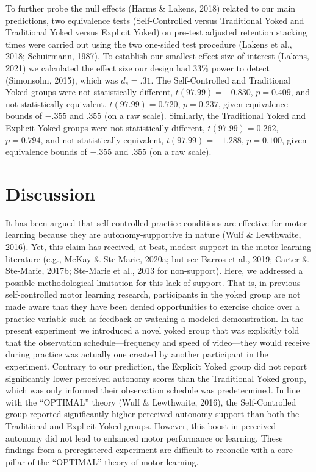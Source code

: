\documentclass[
  english,
  man,floatsintext]{apa7}
\begin{document}
To further probe the null effects (Harms \& Lakens, 2018) related to our main predictions, two equivalence tests (Self-Controlled versus Traditional Yoked and Traditional Yoked versus Explicit Yoked) on pre-test adjusted retention stacking times were carried out using the two one-sided test procedure (Lakens et al., 2018; Schuirmann, 1987). To establish our smallest effect size of interest (Lakens, 2021) we calculated the effect size our design had 33\% power to detect (Simonsohn, 2015), which was \(d_{s} = .31\). The Self-Controlled and Traditional Yoked groups were not statistically different, \(t(97.99) = -0.830\), \(p = 0.409\), and not statistically equivalent, \(t(97.99) = 0.720\), \(p = 0.237\), given equivalence bounds of \(-.355\) and \(.355\) (on a raw scale). Similarly, the Traditional Yoked and Explicit Yoked groups were not statistically different, \(t(97.99) = 0.262\), \(p = 0.794\), and not statistically equivalent, \(t(97.99) = -1.288\), \(p = 0.100\), given equivalence bounds of \(-.355\) and \(.355\) (on a raw scale).

\hypertarget{discussion}{%
\section{Discussion}\label{discussion}}

It has been argued that self-controlled practice conditions are effective for motor learning because they are autonomy-supportive in nature (Wulf \& Lewthwaite, 2016). Yet, this claim has received, at best, modest support in the motor learning literature (e.g., McKay \& Ste-Marie, 2020a; but see Barros et al., 2019; Carter \& Ste-Marie, 2017b; Ste-Marie et al., 2013 for non-support). Here, we addressed a possible methodological limitation for this lack of support. That is, in previous self-controlled motor learning research, participants in the yoked group are not made aware that they have been denied opportunities to exercise choice over a practice variable such as feedback or watching a modeled demonstration. In the present experiment we introduced a novel yoked group that was explicitly told that the observation schedule---frequency and speed of video---they would receive during practice was actually one created by another participant in the experiment. Contrary to our prediction, the Explicit Yoked group did not report significantly lower perceived autonomy scores than the Traditional Yoked group, which was only informed their observation schedule was predetermined. In line with the ``OPTIMAL'' theory (Wulf \& Lewthwaite, 2016), the Self-Controlled group reported significantly higher perceived autonomy-support than both the Traditional and Explicit Yoked groups. However, this boost in perceived autonomy did not lead to enhanced motor performance or learning. These findings from a preregistered experiment are difficult to reconcile with a core pillar of the ``OPTIMAL'' theory of motor learning.
\end{document}
